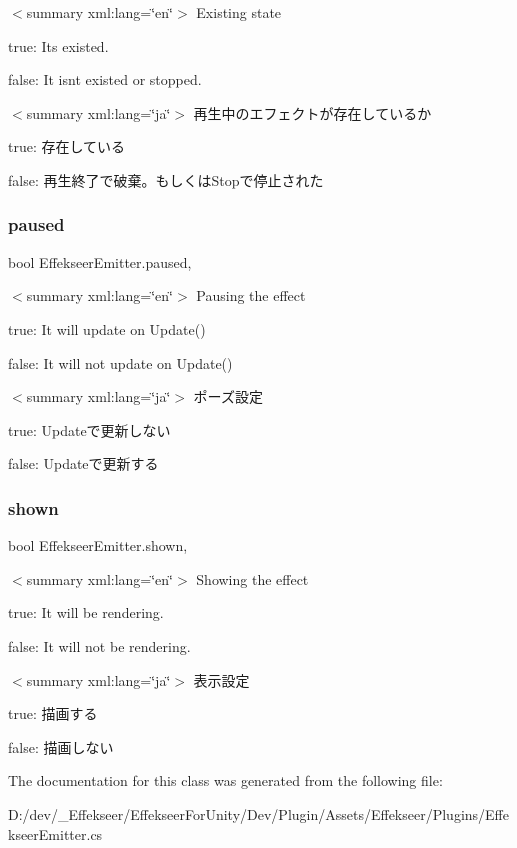$<$summary xml\+:lang=\char`\"{}en\char`\"{}$>$ Existing state 

true\+: It\textquotesingle{}s existed.

false\+: It isn\textquotesingle{}t existed or stopped.

$<$summary xml\+:lang=\char`\"{}ja\char`\"{}$>$ 再生中のエフェクトが存在しているか 

true\+: 存在している

false\+: 再生終了で破棄。もしくは\+Stopで停止された\mbox{\label{class_effekseer_emitter_a5979b4e756a1f31e439752de6fb86c64}} 
\subsubsection{\texorpdfstring{paused}{paused}}
{\footnotesize\ttfamily bool Effekseer\+Emitter.\+paused\hspace{0.3cm}{\ttfamily [get]}, {\ttfamily [set]}}

$<$summary xml\+:lang=\char`\"{}en\char`\"{}$>$ Pausing the effect 

true\+: It will update on Update()

false\+: It will not update on Update()

$<$summary xml\+:lang=\char`\"{}ja\char`\"{}$>$ ポーズ設定 

true\+: Updateで更新しない

false\+: Updateで更新する\mbox{\label{class_effekseer_emitter_a8beed88f3cb7357c4eb088847a6d1fbc}} 
\subsubsection{\texorpdfstring{shown}{shown}}
{\footnotesize\ttfamily bool Effekseer\+Emitter.\+shown\hspace{0.3cm}{\ttfamily [get]}, {\ttfamily [set]}}

$<$summary xml\+:lang=\char`\"{}en\char`\"{}$>$ Showing the effect 

true\+: It will be rendering.

false\+: It will not be rendering.

$<$summary xml\+:lang=\char`\"{}ja\char`\"{}$>$ 表示設定 

true\+: 描画する

false\+: 描画しない

The documentation for this class was generated from the following file\+:\begin{DoxyCompactItemize}
\item 
D\+:/dev/\+\_\+\+Effekseer/\+Effekseer\+For\+Unity/\+Dev/\+Plugin/\+Assets/\+Effekseer/\+Plugins/Effekseer\+Emitter.\+cs\end{DoxyCompactItemize}
